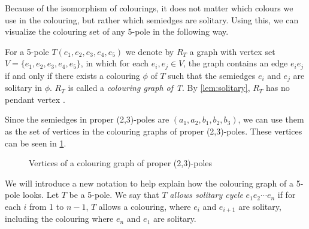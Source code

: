
Because of the isomorphism of colourings, it does not matter which colours we use in the colouring, but rather which semiedges are solitary. Using this, we can visualize the colouring set of any 5-pole in the following way.

For a 5-pole $T(e_1,e_2,e_3,e_4,e_5)$ we denote by $R_T$ a graph with vertex set\linebreak $V=\{e_1,e_2,e_3,e_4,e_5\}$, in which for each $e_i,e_j\in V$, the graph contains an edge $e_ie_j$ if and only if there exists a colouring $\phi$ of $T$ such that the semiedges $e_i$ and $e_j$ are solitary in $\phi$. $R_T$ is called a \textit{colouring graph of T}. By \cref{lem:solitary}, $R_T$ has no pendant vertex \cite{Preissmann1983}.

Since the semiedges in proper (2,3)-poles are $(a_1,a_2,b_1,b_2,b_3)$, we can use them as the set of vertices in the colouring graphs of proper (2,3)-poles. These vertices can be seen in \cref{fig:proper-associated-vertices}.

\begin{figure}
	\centering
	
	\caption{Vertices of a colouring graph of proper (2,3)-poles}
	\label{fig:proper-associated-vertices}
\end{figure}

We will introduce a new notation to help explain how the colouring graph of a 5-pole looks. Let $T$ be a 5-pole. We say that $T$ \textit{allows solitary cycle} $e_1e_2\cdots e_n$ if for each $i$ from 1 to $n-1$, $T$ allows a colouring, where $e_i$ and $e_{i+1}$ are solitary, including the colouring where $e_n$ and $e_1$ are solitary.

